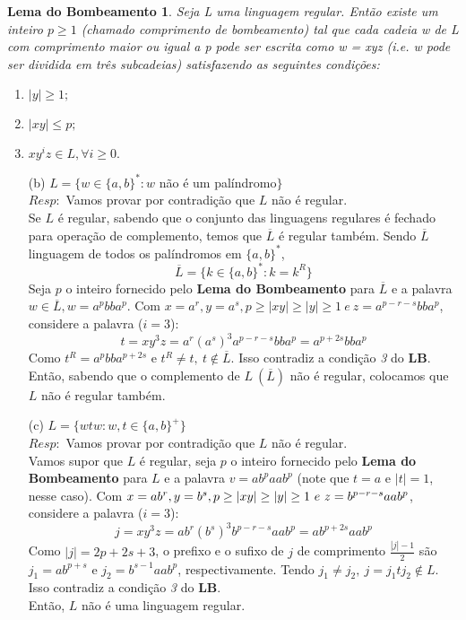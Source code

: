 \documentclass{homework}
\newtheorem*{theorem}{Lema do Bombeamento}
\begin{document}
\pagestyle{fancy}

	\begin{theorem}
		Seja L uma linguagem regular. Então existe um inteiro $p \geq 1$ (chamado 		comprimento de bombeamento) tal que cada cadeia w de L com comprimento maior ou igual a p pode ser escrita como w = xyz (i.e. w pode ser dividida em três subcadeias) satisfazendo as seguintes condições:
		\begin{enumerate}
			\item $|y| \geq 1;$
			\item $|xy| \leq p;$
			\item $xy^iz \in L, \forall i \geq 0.$
		\end{enumerate}
	\end{theorem}
	\begin{enumerate}
		\item[(b)] $L = \{w \in \{a,b\}^*: w$ não é um palíndromo$\}$\\
			$Resp:$ Vamos provar por contradição que $L$ não é regular.\\
			Se $L$ é regular, sabendo que o conjunto das linguagens regulares é fechado para operação de complemento, temos que $\overline{L}$ é regular também. Sendo $\overline{L}$ linguagem de todos os palíndromos em $\{a,b\}^*$, \[\overline{L} = \{k \in \{a,b\}^*:k=k^R\}\]
			Seja $p$ o inteiro fornecido pelo \textbf{Lema do Bombeamento} para $\overline{L}$ e a palavra $w \in \overline{L}, w = a^pbba^p$. Com $x = a^r, y = a^s, p \geq |xy| \geq |y| \geq 1\ e\ z = a^{p-r-s}bba^p$, considere a palavra ($i = 3$):
			\[t = xy^3z = a^r(a^s)^3a^{p-r-s}bba^p = a^{p+2s}bba^p\]
			Como $t^R = a^pbba^{p+2s}$ e $t^R \neq t,\ t \notin \overline{L}$. Isso contradiz a condição \textit{3} do \textbf{LB}.\\
			Então, sabendo que o complemento de $L\ (\overline{L})$ não é regular, colocamos que $L$ não é regular também.
			
		\item[(c)] $L = \{wtw: w,t \in \{a,b\}^+\}$\\
			$Resp:$ Vamos provar por contradição que $L$ não é regular.\\
			Vamos supor que $L$ é regular, seja $p$ o inteiro fornecido pelo \textbf{Lema do Bombeamento} para $L$ e a palavra $v = ab^paab^p$ (note que $t = a$ e $|t| = 1$, nesse caso). Com $x = ab^r, y = b^{s}, \\p \geq |xy| \geq |y| \geq 1\ e\ z = b^{p-r-s}aab^p$, considere a palavra ($i = 3$):
			\[j = xy^3z = ab^r(b^{s})^3b^{p-r-s}aab^p = ab^{p+2s}aab^p\]
			Como $|j| = 2p+2s+3$, o prefixo e o sufixo de $j$ de comprimento $\tfrac{|j|-1}{2}$ são $j_1=ab^{p+s}$ e $j_2=b^{s-1}aab^p$, respectivamente. Tendo $j_1 \neq j_2,\ j = j_1tj_2 \notin L$. Isso contradiz a condição \textit{3} do \textbf{LB}.\\
			Então, $L$ não é uma linguagem regular.
	\end{enumerate}
	
\end{document}
